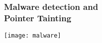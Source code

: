 \begin{frame}
	\frametitle{Malware detection and\\Pointer Tainting}
	\centering \texttt{[image: malware]}	
\end{frame}